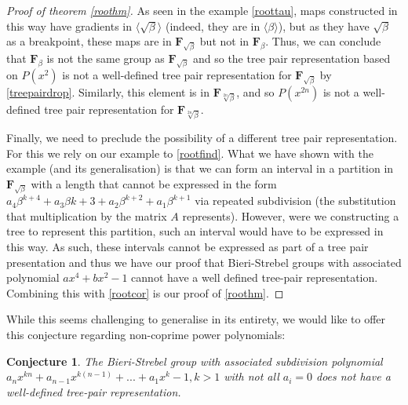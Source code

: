 \documentclass[
11pt, %
english, %
singlespacing, %
parskip, %
headsepline, %
]{amsart} %
\newtheorem{conjecture}[theorem]{Conjecture}
\theoremstyle{definition}
\newcommand{\FN}[1]{$\textbf{F}_{#1}$}
\begin{document}
\begin{proof}[Proof of theorem \ref{roothm}]
As seen in the example \ref{roottau}, maps constructed in this way have gradients  in $\langle \sqrt{\beta} \rangle$ (indeed, they are in $\langle \beta \rangle$), but as they have $\sqrt{\beta}$ as a breakpoint, these maps are in \FN{\sqrt{\beta}} but not in \FN{\beta}. Thus, we can conclude that \FN{\beta} is not the same group as \FN{\sqrt{\beta}} and so the tree pair representation based on $P(x^2)$ is not a well-defined tree pair representation for \FN{\sqrt{\beta}} by \ref{treepairdrop}. Similarly, this element is in \FN{\sqrt[2n]{\beta}}, and so $P(x^{2n})$ is not a well-defined tree pair representation for \FN{\sqrt[2n]{\beta}}.
\par
Finally, we need to preclude the possibility of a different tree pair representation. For this we rely on our example to \ref{rootfind}. What we have shown with the example (and its generalisation) is that we can form an interval in a partition in \FN{\sqrt{\beta}} with a length that cannot be expressed in the form $a_4 \beta^{k+4} + a_3 \beta{k+3} + a_2 \beta^{k+2} + a_1 \beta^{k+1}$ via repeated subdivision (the substitution that multiplication by the matrix $A$ represents). However, were we constructing a tree to represent this partition, such an interval would have to be expressed in this way. As such, these intervals cannot be expressed as part of a tree pair presentation and thus we have our proof that Bieri-Strebel groups with associated polynomial $ax^4+bx^2-1$ cannot have a well defined tree-pair representation. Combining this with \ref{rootcor} is our proof of \ref{roothm}.

\end{proof}
\par
While this seems challenging to generalise in its entirety, we would like to offer this conjecture regarding non-coprime power polynomials:

\begin{conjecture}
The Bieri-Strebel group with associated subdivision polynomial $a_{n}x^{kn} + a_{n-1}x^{k(n-1)}+...+a_1x^k -1, k>1$ with not all $a_i=0$ does not have a well-defined tree-pair representation.
\end{conjecture} 

\printbibliography[heading=bibintoc]
\end{document}
